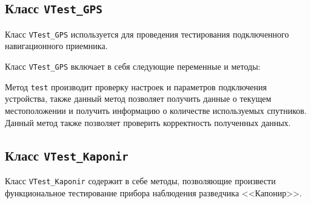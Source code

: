 \subsection{Класс \texttt{VTest\_GPS}}
Класс \texttt{VTest\_GPS} используется для проведения тестирования подключенного навигационного приемника.

Класс \texttt{VTest\_GPS} включает в себя следующие переменные и методы:
\begin{enum}
	\item Метод \texttt{test} производит проверку настроек и параметров подключения устройства, также данный метод
		позволяет получить данные о текущем местоположении и получить информацию о количестве используемых
		спутников. Данный метод также позволяет проверить корректность полученных данных.
\end{enum}


\subsection{Класс \texttt{VTest\_Kaponir}}
Класс \texttt{VTest\_Kaponir} содержит в себе методы, позволяющие произвести функциональное тестирование прибора
наблюдения разведчика <<Капонир>>.

